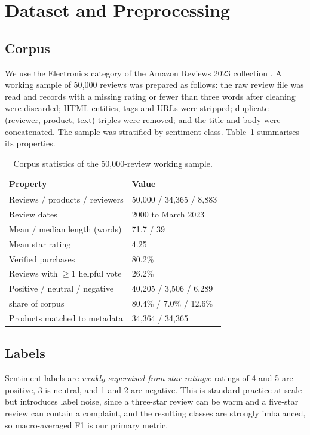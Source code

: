 \documentclass[conference]{IEEEtran}
\begin{document}
\section{Dataset and Preprocessing}
\subsection{Corpus}
We use the Electronics category of the Amazon Reviews 2023 collection \cite{hou2024bridging}. A working sample of 50{,}000 reviews was prepared as follows: the raw review file was read and records with a missing rating or fewer than three words after cleaning were discarded; HTML entities, tags and URLs were stripped; duplicate (reviewer, product, text) triples were removed; and the title and body were concatenated. The sample was stratified by sentiment class. Table~\ref{tab:data} summarises its properties.

\begin{table}[t]
\caption{Corpus statistics of the 50{,}000-review working sample.}
\label{tab:data}
\centering
\small
\begin{tabular}{@{}ll@{}}
\toprule
Property & Value \\
\midrule
Reviews / products / reviewers & 50{,}000 / 34{,}365 / 8{,}883 \\
Review dates & 2000 to March 2023 \\
Mean / median length (words) & 71.7 / 39 \\
Mean star rating & 4.25 \\
Verified purchases & 80.2\% \\
Reviews with $\ge$1 helpful vote & 26.2\% \\
Positive / neutral / negative & 40{,}205 / 3{,}506 / 6{,}289 \\
\quad share of corpus & 80.4\% / 7.0\% / 12.6\% \\
Products matched to metadata & 34{,}364 / 34{,}365 \\
\bottomrule
\end{tabular}
\end{table}

\subsection{Labels}
Sentiment labels are \emph{weakly supervised from star ratings}: ratings of 4 and 5 are positive, 3 is neutral, and 1 and 2 are negative. This is standard practice at scale but introduces label noise, since a three-star review can be warm and a five-star review can contain a complaint, and the resulting classes are strongly imbalanced, so macro-averaged F1 is our primary metric.
\end{document}
